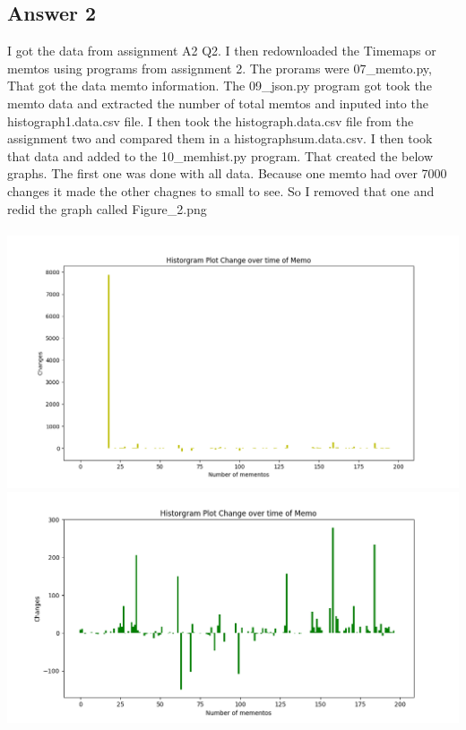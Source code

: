 \documentclass[10pt,letterpaper]{article}
\begin{document}
\subsection{Answer 2}

I got the data from assignment A2 Q2. I then redownloaded the Timemaps or memtos using programs from assignment 2. The prorams were 07\_memto.py,  That got the data memto information.  The 09\_json.py program got took the memto data and extracted the number of total memtos and inputed into the histograph1.data.csv file.  I then took the histograph.data.csv file from the assignment two and compared them in a histographsum.data.csv.  I then took that data and added to the 10\_memhist.py program.  That created the below graphs.  The first one was done with all data.  Because one memto had over 7000 changes it made the other chagnes to small to see.  So I removed that one and redid the graph called Figure\_2.png\\
\\
\includegraphics[scale=.3]{Figure_1.png}
\includegraphics[scale=.4]{Figure_2.png}
\\
\pagebreak
\end{document}
